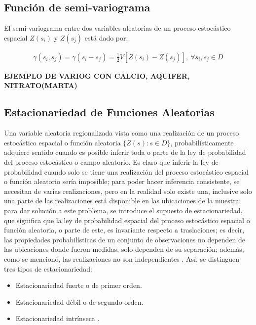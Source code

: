 \documentclass[
]{book}
\providecommand{\tightlist}{%
  \setlength{\itemsep}{0pt}\setlength{\parskip}{0pt}}
\begin{document}
\hypertarget{funciuxf3n-de-semi-variograma}{%
\subsection{Función de semi-variograma}\label{funciuxf3n-de-semi-variograma}}

El semi-variograma entre dos variables aleatorias de un proceso estocástico espacial \(Z(s_i)\) y \(Z(s_j)\) está dado por:

\begin{align}
  \gamma(s_i,s_j)=\gamma(s_i-s_j)= \frac{1}{2} V[Z(s_i)-Z(s_j)], \ \forall s_i,s_j \in D 
\end{align}

\textbf{EJEMPLO DE VARIOG CON CALCIO, AQUIFER, NITRATO(MARTA)}

\hypertarget{estacionariedad-de-funciones-aleatorias}{%
\subsection{Estacionariedad de Funciones Aleatorias}\label{estacionariedad-de-funciones-aleatorias}}

Una variable aleatoria regionalizada vista como una realización de un proceso estocástico espacial o función aleatoria \(\{Z(s):s\in D\}\), probabilísticamente adquiere sentido cuando es posible inferir toda o parte de la ley de probabilidad del proceso estocástico o campo aleatorio. Es claro que inferir la ley de probabilidad cuando solo se tiene una realización del proceso estocástico espacial o función aleatorio sería imposible; para poder hacer inferencia consistente, se necesitan de varias realizaciones, pero en la realidad solo existe una, inclusive solo una parte de las realizaciones está disponible en las ubicaciones de la muestra; para dar solución a este problema, se introduce el supuesto de estacionariedad, que significa que la ley de probabilidad espacial del proceso estocástico espacial o función aleatoria, o parte de este, es invariante respecto a traslaciones; es decir, las propiedades probabilísticas de un conjunto de observaciones no dependen de las ubicaciones donde fueron medidas, solo dependen de su separación; además, como se mencionó, las realizaciones no son independientes \citep{montero}. Así, se distinguen tres tipos de estacionariedad:

\begin{itemize}
\tightlist
\item
  Estacionariedad fuerte o de primer orden.
\item
  Estacionariedad débil o de segundo orden.
\item
  Estacionariedad intrínseca .
\end{itemize}
\end{document}
